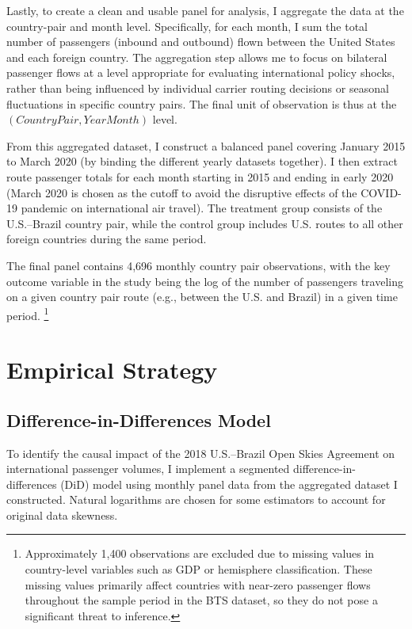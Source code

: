 \documentclass[12pt]{article}
\begin{document}
Lastly, to create a clean and usable panel for analysis,  I aggregate the data at the country-pair and month level. Specifically, for each month, I sum the total number of passengers (inbound and outbound) flown between the United States and each foreign country. The aggregation step allows me to focus on bilateral passenger flows at a level appropriate for evaluating international policy shocks, rather than being influenced by individual carrier routing decisions or seasonal fluctuations in specific country pairs. The final unit of observation is thus at the $(Country Pair, YearMonth)$ level.

From this aggregated dataset, I construct a balanced panel covering January 2015 to March 2020 (by binding the different yearly datasets together). I then extract route passenger totals for each month starting in 2015 and ending in early 2020 (March 2020 is chosen as the cutoff to avoid the disruptive effects of the COVID-19 pandemic on international air travel). The treatment group consists of the U.S.–Brazil country pair, while the control group includes U.S. routes to all other foreign countries during the same period. 

The final panel contains 4,696 monthly country pair observations, with the key outcome variable in the study being the log of the number of passengers traveling on a given country pair route (e.g., between the U.S. and Brazil) in a given time period. \footnote{Approximately 1,400 observations are excluded due to missing values in country-level variables such as GDP or hemisphere classification. These missing values primarily affect countries with near-zero passenger flows throughout the sample period in the BTS dataset, so they do not pose a significant threat to inference.}

\section{Empirical Strategy}
\subsection{Difference-in-Differences Model}

To identify the causal impact of the 2018 U.S.–Brazil Open Skies Agreement on international passenger volumes, I implement a segmented difference-in-differences (DiD) model using monthly panel data from the aggregated dataset I constructed. Natural logarithms are chosen for some estimators to account for original data skewness.
\end{document}
